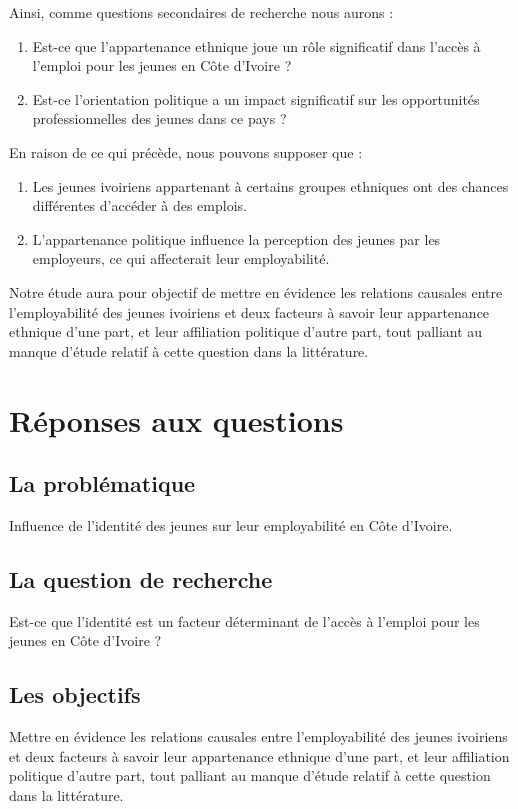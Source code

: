 \documentclass[12pt,a4paper, openany]{book}
\begin{document}
\noindent Ainsi, comme questions secondaires de recherche nous aurons :

\begin{enumerate}[label=\arabic*)]
	\item Est-ce que l'appartenance ethnique joue un rôle significatif dans l'accès à l'emploi pour les jeunes en Côte d'Ivoire ?
	\item Est-ce l'orientation politique a un impact significatif sur les opportunités professionnelles des jeunes dans ce pays ?
\end{enumerate}

\noindent En raison de ce qui précède, nous pouvons supposer que :
\begin{enumerate}[label=\arabic*)]
	\item Les jeunes ivoiriens appartenant à certains groupes ethniques ont des chances différentes d'accéder à des emplois.
	\item L'appartenance politique influence la perception des jeunes par les employeurs, ce qui affecterait leur employabilité. 
\end{enumerate}

\noindent Notre étude aura pour objectif de mettre en évidence les relations causales entre l'employabilité des jeunes ivoiriens et deux facteurs à savoir leur appartenance ethnique d'une part, et leur affiliation politique d'autre part, tout palliant au manque d'étude relatif à cette question dans la littérature.

\newpage
\chapter{Réponses aux questions}

\section{La problématique}
Influence de l'identité des jeunes sur leur employabilité en Côte d'Ivoire.

\section{La question de recherche}
Est-ce que l'identité est un facteur déterminant de l'accès à l'emploi pour les jeunes en Côte d'Ivoire ?

\section{Les objectifs}
Mettre en évidence les relations causales entre l'employabilité des jeunes ivoiriens et deux facteurs à savoir leur appartenance ethnique d'une part, et leur affiliation politique d'autre part, tout palliant au manque d'étude relatif à cette question dans la littérature.
\end{document}
